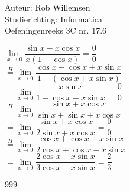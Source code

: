 \documentclass[a4paper]{article}
\newcommand{\limit}{\lim\limits}
\begin{document}
\noindent \large Auteur: Rob Willemsen \\
\noindent \large Studierichting: Informatica \\
\noindent \large Oefeningenreeks 3C nr. 17.6 \\

\medskip

\normalsize

$\limit_{x \rightarrow 0} \dfrac{\sin x - x\cos x}{x(1-\cos x)} = \dfrac{0}{0}$ \\

$\overset{H}{=}\limit_{x \rightarrow 0} \dfrac{\cos x - \cos x + x\sin x}{1-(\cos x + x\sin x)}$ \\

$= \limit_{x \rightarrow 0} \dfrac{x\sin x}{1-\cos x + x\sin x} = \dfrac{0}{0}$ \\

$\overset{H}{=}\limit_{x \rightarrow 0} \dfrac{\sin x + x\cos x}{\sin x + \sin x + x\cos x}$ \\

$= \limit_{x \rightarrow 0} \dfrac{\sin x + x\cos x}{2\sin x + x\cos x} = \dfrac{0}{0}$ \\

$\overset{H}{=}\limit_{x \rightarrow 0} \dfrac{\cos x + \cos x - x\sin x}{2\cos x + \cos x - x\sin x}$ \\

$= \limit_{x \rightarrow 0} \dfrac{2\cos x - x\sin x}{3\cos x - x\sin x} = \dfrac{2}{3}$ \\


\begin{thebibliography}{999}
\end{thebibliography}
\end{document}
